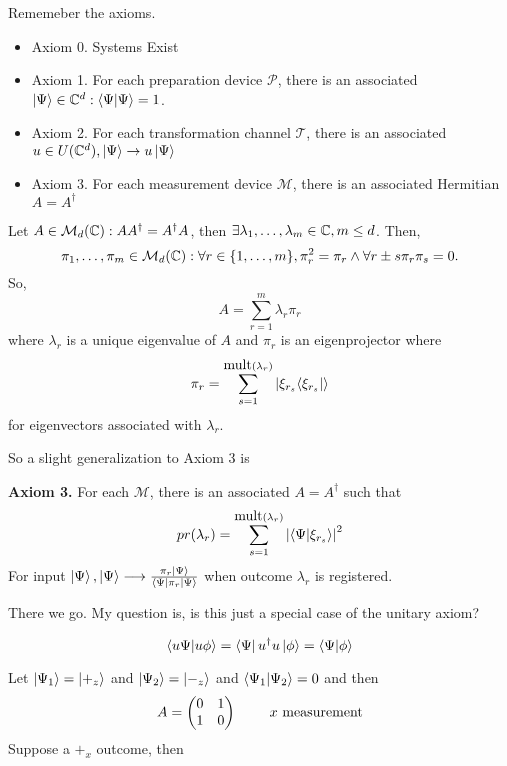 \documentclass[english, 11pt]{article}
\begin{document}
       Rememeber the axioms.

        \begin{itemize}
        \item Axiom 0. Systems Exist
        \item Axiom 1. For each preparation device $\mathcal{P}$, there is an associated $\kpsi \in \C^d : \braket{\Psi}{\Psi} = 1$.
        \item Axiom 2. For each transformation channel $\mathcal{T}$, there is an associated $u \in U({\mathbb{C}}^d), \left|\Psi\right\rangle \rightarrow u\left|\Psi\right\rangle$
        \item Axiom 3. For each measurement device $\mathcal{M}$, there is an associated Hermitian $A = A^\dagger$
      \end{itemize}

      \begin{thrm}
        Let $A \in \mathcal{M}_d({\mathbb{C}}): AA^\dagger = A^\dagger A$, then $\exists \lambda_1, \ldots, \lambda_m \in {\mathbb{C}}, m \leq d$. Then,
        \[ \pi_1,\ldots,\pi_m \in \mathcal{M}_d({\mathbb{C}}) : \forall r \in \{1,\ldots,m\}, \pi_r^2 = \pi_r \land \forall r \pm s \pi_r\pi_s = 0. \]
        So,
        \[ A = \sum_{r=1}^m \lambda_r\pi_r \]
        where $\lambda_r$ is a unique eigenvalue of $A$ and $\pi_r$ is an eigenprojector where
        \[ \pi_r = \sum_{s=1}^{\mbox{mult}(\lambda_r)} \left|\xi_{r_s}{\left\langle\xi_{r_s}\right|}\right\rangle \]
        for eigenvectors associated with $\lambda_r$.
      \end{thrm}

      So a slight generalization to Axiom 3 is \newline

      \textbf{Axiom 3.} For each $\mathcal{M}$, there is an associated $A = A^\dagger$ such that
      \[ pr(\lambda_r) = \sum_{s=1}^{\mbox{mult}(\lambda_r)} \left| \braket{\Psi}{\xi_{r_s}} \right|^2 \]
      For input $\left|\Psi\right\rangle, \left|\Psi\right\rangle \longrightarrow \frac{\pi_r\left|\Psi\right\rangle}{\left\langle\Psi\right|\pi_r\left|\Psi\right\rangle}$
      when outcome $\lambda_r$ is registered.

      There we go. My question is, is this just a special case of the unitary axiom?

      \[ \braket{u\Psi}{u\phi} = \bra{\Psi}u^\dagger u\ket{\phi} = \braket{\Psi}{\phi} \]

      Let $\left|\Psi_1\right\rangle = \left|+_z\right\rangle$ and $\left|\Psi_2\right\rangle = \left|-_z\right\rangle$ and $\braket{\Psi_1}{\Psi_2} = 0$ and then
      \[ A = \mtx{0 & 1 \\ 1 & 0} \mbox{ \ \ \ \ \ \ $x$ measurement} \]
      Suppose a $+_x$ outcome, then
\end{document}
